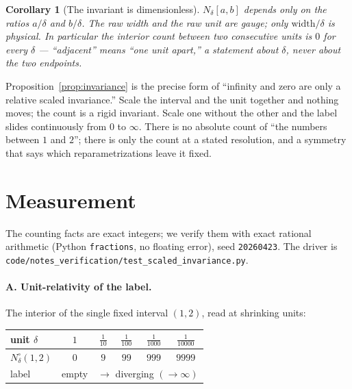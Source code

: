 \documentclass[11pt]{article}
\theoremstyle{definition}
\theoremstyle{plain}
\newtheorem{corollary}{Corollary}
\begin{document}
\begin{corollary}[The invariant is dimensionless]\label{cor:dimless}
$N_\delta[a,b]$ depends only on the ratios $a/\delta$ and $b/\delta$. The raw width and the raw unit
are gauge; only $\mathrm{width}/\delta$ is physical. In particular the interior count between two
consecutive units is $0$ for \emph{every} $\delta$ --- ``adjacent'' means ``one unit apart,'' a
statement about $\delta$, never about the two endpoints.
\end{corollary}

Proposition~\ref{prop:invariance} is the precise form of ``infinity and zero are only a relative
scaled invariance.'' Scale the interval and the unit together and nothing moves; the count is a rigid
invariant. Scale one without the other and the label slides continuously from $0$ to $\infty$. There
is no absolute count of ``the numbers between $1$ and $2$''; there is only the count at a stated
resolution, and a symmetry that says which reparametrizations leave it fixed.

\section{Measurement}\label{sec:meas}

The counting facts are exact integers; we verify them with exact rational arithmetic (Python
\texttt{fractions}, no floating error), seed \texttt{20260423}. The driver is
\texttt{code/notes\_verification/test\_scaled\_invariance.py}.

\paragraph{A. Unit-relativity of the label.} The interior of the single fixed interval $(1,2)$, read
at shrinking units:

\begin{center}
\renewcommand{\arraystretch}{1.3}
\begin{tabular}{@{}lccccc@{}}
\toprule
unit $\delta$ & $1$ & $\tfrac{1}{10}$ & $\tfrac{1}{100}$ & $\tfrac{1}{1000}$ & $\tfrac{1}{10000}$\\
\midrule
$N_\delta^{\circ}(1,2)$ & $0$ & $9$ & $99$ & $999$ & $9999$\\
label & empty & \multicolumn{4}{c}{$\longrightarrow$ diverging $(\to\infty)$}\\
\bottomrule
\end{tabular}
\end{center}
\end{document}

